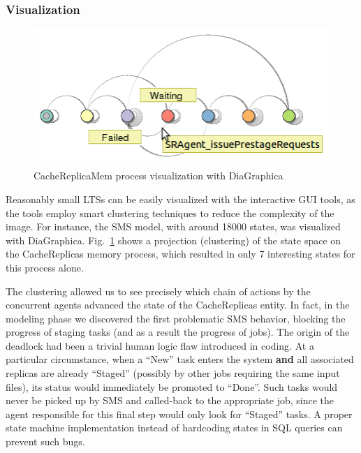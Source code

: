 \documentclass[10pt,conference]{IEEEtran}
\begin{document}
\subsubsection{Visualization}
\begin{figure}[bp]
\vspace{-20 pt}
\includegraphics[width=0.9\linewidth,keepaspectratio=true]{./DiaGraphica.png}
\centering
\caption{CacheReplicaMem process visualization with DiaGraphica}
\label{fig:DiaGraphica}
\end{figure}%
Reasonably small LTSs can be easily visualized with the interactive GUI tools,
as the tools employ smart clustering techniques to reduce the complexity of the image.
For instance, the SMS model, with around 18000 states,
was visualized with DiaGraphica. Fig.~\ref{fig:DiaGraphica} shows a projection (clustering) of the state space
on the CacheReplicas memory process, which resulted in only 7 interesting states for this process alone.

The clustering
allowed us to see precisely which chain of actions by the concurrent agents
advanced the state of the CacheReplicas entity. In fact, in the modeling phase we discovered the first problematic
SMS behavior, blocking the progress of staging
tasks (and as a result the progress of jobs). The origin of the deadlock had been a
trivial human logic flaw introduced in coding. At a particular circumstance,
when a ``New'' task enters the system \textbf{and} all associated replicas
are already ``Staged'' (possibly by other jobs requiring the same input files),
its status would immediately be promoted to ``Done''.
Such tasks would never be picked up by SMS and called-back to the appropriate job, 
since the agent responsible for this final step would only look for ``Staged'' tasks.
A proper state machine implementation
instead of hardcoding states in SQL queries can prevent such bugs.
\end{document}
